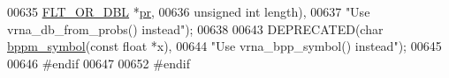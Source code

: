 \begin{DoxyCode}
00635                                    \hyperlink{group__data__structures_ga31125aeace516926bf7f251f759b6126}{FLT\_OR\_DBL}   *\hyperlink{fold__vars_8h_ac98ec419070aee6831b44e5c700f090f}{pr},
00636                                    \textcolor{keywordtype}{unsigned} \textcolor{keywordtype}{int} length),
00637 \textcolor{stringliteral}{"Use vrna\_db\_from\_probs() instead"});
00638 
00643 DEPRECATED(\textcolor{keywordtype}{char}    \hyperlink{group__struct__utils_ga49962ad6242b8c628de6ca16bb831c1d}{bppm\_symbol}(\textcolor{keyword}{const} \textcolor{keywordtype}{float} *x),
00644 \textcolor{stringliteral}{"Use vrna\_bpp\_symbol() instead"});
00645 
00646 \textcolor{preprocessor}{#endif}
00647 
00652 \textcolor{preprocessor}{#endif}
\end{DoxyCode}
